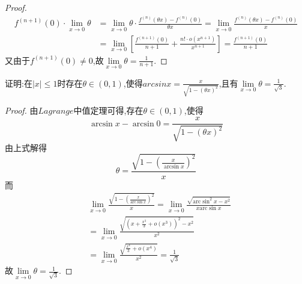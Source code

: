 \documentclass[lang=cn,newtx,10pt,scheme=chinese]{../Template/elegantbook}
\begin{document}
\begin{proof}
        \begin{equation}
        \begin{split}
            f^{\left( n+1 \right)}\left( 0 \right) \cdot \underset{x\rightarrow 0}{\lim}\theta &=\underset{x\rightarrow 0}{\lim}\theta \cdot \frac{f^{\left( n \right)}\left( \theta x \right) -f^{\left( n \right)}\left( 0 \right)}{\theta x}=\underset{x\rightarrow 0}{\lim}\frac{f^{\left( n \right)}\left( \theta x \right) -f^{\left( n \right)}\left( 0 \right)}{x}
            \\
            &=\underset{x\rightarrow 0}{\lim}\left[ \frac{f^{\left( n+1 \right)}\left( 0 \right)}{n+1}+\frac{n!\cdot o\left( x^{n+1} \right)}{x^{n+1}} \right] =\frac{f^{\left( n+1 \right)}\left( 0 \right)}{n+1}
        \end{split}
        \nonumber  
    \end{equation}
        又由于\(f^{(n + 1)}(0)\neq0\),故$\underset{x\rightarrow 0}{\lim}\theta =\frac{1}{n+1}$.
    \end{proof}


\begin{exercise}
    证明:在\(\vert x\vert\leq1\)时存在\(\theta\in(0,1)\),使得\(arcsinx=\frac{x}{\sqrt{1-\left( \theta x \right) ^2}}\),且有\(\lim\limits_{x\to0}\theta=\frac{1}{\sqrt{3}}\).
\end{exercise}
    \begin{proof}
        由$Lagrange$中值定理可得,存在$\theta\in(0,1)$,使得
        \begin{equation}
            \arcsin x-\arcsin 0=\frac{x}{\sqrt{1-\left( \theta x \right) ^2}}
        \nonumber
        \end{equation}
        由上式解得
        \begin{equation}
            \theta =\frac{\sqrt{1-\left( \frac{x}{\arcsin x} \right) ^2}}{x}
            \nonumber
        \end{equation}
        而
        \begin{equation}
            \begin{split}
                &\lim_{x\rightarrow 0} \frac{\sqrt{1-\left( \frac{x}{\mathrm{arc}\sin x} \right) ^2}}{x}=\lim_{x\rightarrow 0} \frac{\sqrt{\mathrm{arc}\sin ^2x-x^2}}{x\mathrm{arc}\sin x}
                \\
                &=\lim_{x\rightarrow 0} \frac{\sqrt{\left( x+\frac{x^3}{3}+o\left( x^3 \right) \right) ^2-x^2}}{x^2}
                \\
                &=\lim_{x\rightarrow 0} \frac{\sqrt{\frac{x^4}{3}+o\left( x^4 \right)}}{x^2}=\frac{1}{\sqrt{3}}
            \end{split}
            \nonumber
        \end{equation}
        故\(\lim\limits_{x\to0}\theta=\frac{1}{\sqrt{3}}\).
    \end{proof}
\end{document}
